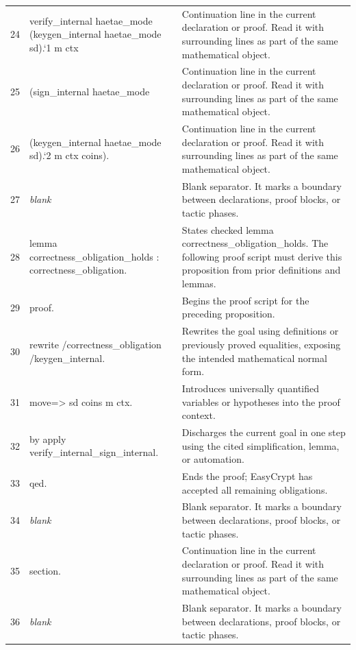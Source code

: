 \documentclass[10pt]{article}
\begin{document}
\begin{longtable}{r L{0.53\textwidth} L{0.37\textwidth}}
24 & {\ttfamily\scriptsize     verify\_internal haetae\_mode (keygen\_internal haetae\_mode sd).`1 m ctx} & Continuation line in the current declaration or proof.  Read it with surrounding lines as part of the same mathematical object. \\
25 & {\ttfamily\scriptsize       (sign\_internal haetae\_mode} & Continuation line in the current declaration or proof.  Read it with surrounding lines as part of the same mathematical object. \\
26 & {\ttfamily\scriptsize         (keygen\_internal haetae\_mode sd).`2 m ctx coins).} & Continuation line in the current declaration or proof.  Read it with surrounding lines as part of the same mathematical object. \\
27 & {\ttfamily\scriptsize \emph{blank}} & Blank separator.  It marks a boundary between declarations, proof blocks, or tactic phases. \\
28 & {\ttfamily\scriptsize lemma correctness\_obligation\_holds : correctness\_obligation.} & States checked lemma correctness\_obligation\_holds.  The following proof script must derive this proposition from prior definitions and lemmas. \\
29 & {\ttfamily\scriptsize proof.} & Begins the proof script for the preceding proposition. \\
30 & {\ttfamily\scriptsize rewrite /correctness\_obligation /keygen\_internal.} & Rewrites the goal using definitions or previously proved equalities, exposing the intended mathematical normal form. \\
31 & {\ttfamily\scriptsize move=> sd coins m ctx.} & Introduces universally quantified variables or hypotheses into the proof context. \\
32 & {\ttfamily\scriptsize by apply verify\_internal\_sign\_internal.} & Discharges the current goal in one step using the cited simplification, lemma, or automation. \\
33 & {\ttfamily\scriptsize qed.} & Ends the proof; EasyCrypt has accepted all remaining obligations. \\
34 & {\ttfamily\scriptsize \emph{blank}} & Blank separator.  It marks a boundary between declarations, proof blocks, or tactic phases. \\
35 & {\ttfamily\scriptsize section.} & Continuation line in the current declaration or proof.  Read it with surrounding lines as part of the same mathematical object. \\
36 & {\ttfamily\scriptsize \emph{blank}} & Blank separator.  It marks a boundary between declarations, proof blocks, or tactic phases. \\

\end{longtable}
\end{document}
